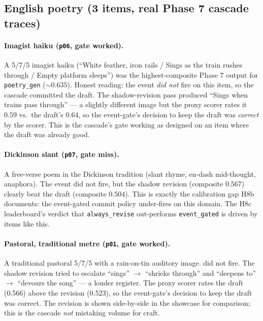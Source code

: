 \subsection{English poetry (3 items, real Phase 7 cascade traces)}

\paragraph{Imagist haiku (\texttt{p06}, gate worked).} A 5/7/5 imagist haiku (``White feather, iron rails / Sings as the train rushes through / Empty platform sleeps'') was the highest-composite Phase 7 output for \texttt{poetry\_gen} ($\sim\!0.635$). Honest reading: the  event \emph{did not} fire on this item, so the cascade committed the draft. The shadow-revision pass produced ``Sings when trains pass through'' --- a slightly different image but the proxy scorer rates it $0.59$ vs.\ the draft's $0.64$, so the event-gate's decision to keep the draft was \emph{correct} by the scorer. This is the cascade's gate working as designed on an item where the draft was already good.

\paragraph{Dickinson slant (\texttt{p07}, gate miss).} A free-verse poem in the Dickinson tradition (slant rhyme, en-dash mid-thought, anaphora). The  event did not fire, but the shadow revision (composite $0.567$) clearly beat the draft (composite $0.504$). This is exactly the calibration gap H8b documents: the event-gated commit policy under-fires on this domain. The H8c leaderboard's verdict that \texttt{always\_revise} out-performs \texttt{event\_gated} is driven by items like this.

\paragraph{Pastoral, traditional metre (\texttt{p01}, gate worked).} A traditional pastoral 5/7/5 with a rain-on-tin auditory image.  did not fire. The shadow revision tried to escalate ``sings'' $\to$ ``shrieks through'' and ``deepens to'' $\to$ ``devours the song'' --- a louder register. The proxy scorer rates the draft (0.566) above the revision (0.523), so the event-gate's decision to keep the draft was correct. The revision is shown side-by-side in the showcase for comparison; this is the cascade \emph{not} mistaking volume for craft.

